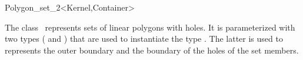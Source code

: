 \ccRefPageBegin

\begin{ccRefClass}{Polygon_set_2<Kernel,Container>}

\ccThreeToTwo
    
\ccDefinition

The class \ccRefName\ represents sets of linear polygons with holes.
It is parameterized with two types ( and ) that
are used to instantiate the type .
The latter is used to represents the outer boundary and the boundary of the
holes of the set members.


\ccInheritsFrom

\ccSeeAlso
  \\

\end{ccRefClass}
\ccRefPageEnd
